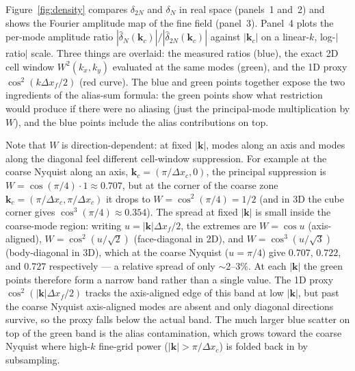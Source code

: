 \documentclass[12pt]{article}
\begin{document}
Figure~\ref{fig:density} compares $\delta_{2N}$ and $\delta_N$ in real
space (panels~1 and~2) and shows the Fourier amplitude map of the fine
field (panel~3). Panel~4 plots the per-mode amplitude ratio
$|\hat\delta_N(\mathbf k_c)|/|\hat\delta_{2N}(\mathbf k_c)|$ against
$|\mathbf k_c|$ on a linear-$k$, log-$|$ratio$|$ scale. Three things
are overlaid: the measured ratios (blue), the exact 2D cell window
$W^2(k_x,k_y)$ evaluated at the same modes (green), and the 1D proxy
$\cos^2(k\Delta x_f/2)$ (red curve). The blue and green points
together expose the two ingredients of the alias-sum formula: the
green points show what restriction would produce if there were no
aliasing (just the principal-mode multiplication by $W$), and the blue
points include the alias contributions on top.

Note that $W$ is direction-dependent: at fixed $|\mathbf k|$, modes
along an axis and modes along the diagonal feel different cell-window
suppression. For example at the coarse Nyquist along an axis,
$\mathbf k_c=(\pi/\Delta x_c, 0)$, the principal suppression is
$W=\cos(\pi/4)\cdot 1 \approx 0.707$, but at the corner of the coarse
zone $\mathbf k_c=(\pi/\Delta x_c, \pi/\Delta x_c)$ it drops to
$W=\cos^2(\pi/4)=1/2$ (and in 3D the cube corner gives
$\cos^3(\pi/4)\approx 0.354$). The spread at fixed $|\mathbf k|$ is
small inside the coarse-mode region: writing $u=|\mathbf
k|\Delta x_f/2$, the extremes are $W=\cos u$ (axis-aligned),
$W=\cos^2(u/\sqrt 2)$ (face-diagonal in 2D), and $W=\cos^3(u/\sqrt 3)$
(body-diagonal in 3D), which at the coarse Nyquist ($u=\pi/4$) give
$0.707$, $0.722$, and $0.727$ respectively --- a relative spread of
only $\sim$2--3\%. At each $|\mathbf k|$ the green points therefore
form a narrow band rather than a single value. The 1D proxy
$\cos^2(|\mathbf k|\Delta x_f/2)$ tracks the axis-aligned edge of this
band at low $|\mathbf k|$, but past the coarse Nyquist axis-aligned
modes are absent and only diagonal directions survive, so the proxy
falls below the actual band. The much larger blue
scatter on top of the green band is the alias contamination, which
grows toward the coarse Nyquist where high-$k$ fine-grid power
($|\mathbf k|>\pi/\Delta x_c$) is folded back in by subsampling.
\end{document}
